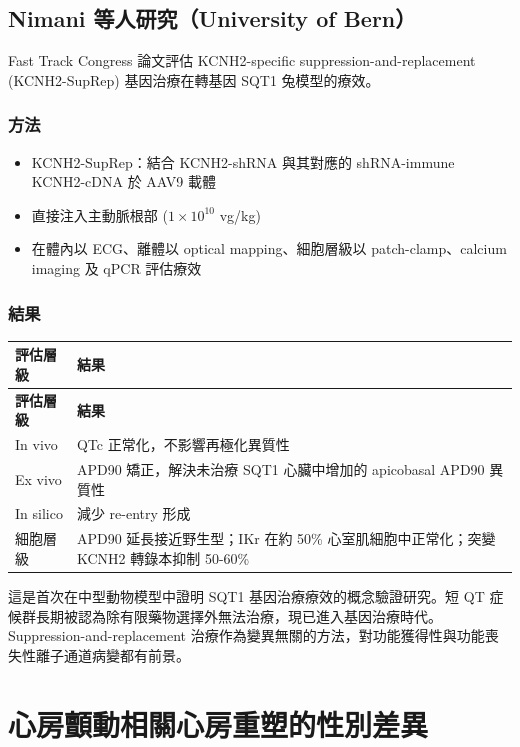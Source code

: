 \documentclass[12pt,a4paper]{article}
\newcommand{\note}[1]{
    \par
    \noindent
    \begin{tcolorbox}[
        colback=emergency_blue!5!white,
        colframe=emergency_blue,
        title=\textbf{重點提醒},
        fonttitle=\bfseries,
        boxrule=0.5pt,
        arc=3pt,
        left=6pt,
        right=6pt,
        top=6pt,
        bottom=6pt
    ]
    #1
    \end{tcolorbox}
}
\begin{document}
\subsection{Nimani 等人研究（University of Bern）}

Fast Track Congress 論文評估 KCNH2-specific suppression-and-replacement (KCNH2-SupRep) 基因治療在轉基因 SQT1 兔模型的療效。

\subsubsection{方法}
\begin{itemize}
    \item KCNH2-SupRep：結合 KCNH2-shRNA 與其對應的 shRNA-immune KCNH2-cDNA 於 AAV9 載體
    \item 直接注入主動脈根部 ($1 \times 10^{10}$ vg/kg)
    \item 在體內以 ECG、離體以 optical mapping、細胞層級以 patch-clamp、calcium imaging 及 qPCR 評估療效
\end{itemize}

\subsubsection{結果}

\begin{longtable}{p{4cm}p{10cm}}
\toprule
\textbf{評估層級} & \textbf{結果} \\
\midrule
\endfirsthead
\toprule
\textbf{評估層級} & \textbf{結果} \\
\midrule
\endhead
In vivo & QTc 正常化，不影響再極化異質性 \\
\midrule
Ex vivo & APD90 矯正，解決未治療 SQT1 心臟中增加的 apicobasal APD90 異質性 \\
\midrule
In silico & 減少 re-entry 形成 \\
\midrule
細胞層級 & APD90 延長接近野生型；IKr 在約 50\% 心室肌細胞中正常化；突變 KCNH2 轉錄本抑制 50-60\% \\
\bottomrule
\end{longtable}

\note{
這是首次在中型動物模型中證明 SQT1 基因治療療效的概念驗證研究。短 QT 症候群長期被認為除有限藥物選擇外無法治療，現已進入基因治療時代。Suppression-and-replacement 治療作為變異無關的方法，對功能獲得性與功能喪失性離子通道病變都有前景。
}

\section{心房顫動相關心房重塑的性別差異}
\end{document}
